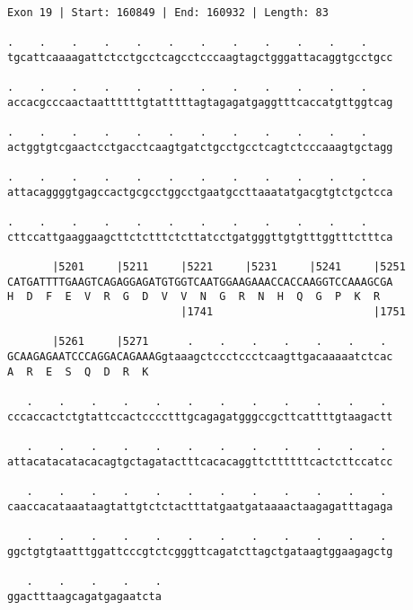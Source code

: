 \documentclass{article}
\begin{document}
\begin{Verbatim}
Exon 19 | Start: 160849 | End: 160932 | Length: 83
 
.    .    .    .    .    .    .    .    .    .    .    .    
tgcattcaaaagattctcctgcctcagcctcccaagtagctgggattacaggtgcctgcc
  
.    .    .    .    .    .    .    .    .    .    .    .    
accacgcccaactaattttttgtatttttagtagagatgaggtttcaccatgttggtcag
  
.    .    .    .    .    .    .    .    .    .    .    .    
actggtgtcgaactcctgacctcaagtgatctgcctgcctcagtctcccaaagtgctagg
  
.    .    .    .    .    .    .    .    .    .    .    .    
attacaggggtgagccactgcgcctggcctgaatgccttaaatatgacgtgtctgctcca
  
.    .    .    .    .    .    .    .    .    .    .    .    
cttccattgaaggaagcttctctttctcttatcctgatgggttgtgtttggtttctttca
  
       |5201     |5211     |5221     |5231     |5241     |5251
CATGATTTTGAAGTCAGAGGAGATGTGGTCAATGGAAGAAACCACCAAGGTCCAAAGCGA
H  D  F  E  V  R  G  D  V  V  N  G  R  N  H  Q  G  P  K  R  
                           |1741                         |1751
  
       |5261     |5271      .    .    .    .    .    .    . 
GCAAGAGAATCCCAGGACAGAAAGgtaaagctccctccctcaagttgacaaaaatctcac
A  R  E  S  Q  D  R  K                                      
  
   .    .    .    .    .    .    .    .    .    .    .    . 
cccaccactctgtattccactcccctttgcagagatgggccgcttcattttgtaagactt
  
   .    .    .    .    .    .    .    .    .    .    .    . 
attacatacatacacagtgctagatactttcacacaggttcttttttcactcttccatcc
  
   .    .    .    .    .    .    .    .    .    .    .    . 
caaccacataaataagtattgtctctactttatgaatgataaaactaagagatttagaga
  
   .    .    .    .    .    .    .    .    .    .    .    . 
ggctgtgtaatttggattcccgtctcgggttcagatcttagctgataagtggaagagctg
  
   .    .    .    .    .
ggactttaagcagatgagaatcta
\end{Verbatim}
\newpage
\end{document}
